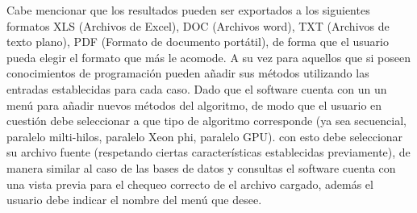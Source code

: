 Cabe mencionar que los resultados pueden ser exportados a los siguientes formatos XLS (Archivos de Excel), DOC (Archivos word), TXT (Archivos de texto plano), PDF (Formato de documento portátil), de forma que el usuario pueda elegir el formato que más le acomode. A su vez para aquellos que si poseen conocimientos de programación pueden añadir sus métodos utilizando las entradas establecidas para cada caso. Dado que el software cuenta con un un menú para añadir nuevos métodos del algoritmo, de modo que el usuario en cuestión debe seleccionar a que tipo de algoritmo corresponde (ya sea secuencial, paralelo milti-hilos, paralelo Xeon phi, paralelo GPU). con esto debe seleccionar su archivo fuente (respetando ciertas características establecidas previamente), de manera similar al caso de las bases de datos y consultas el software cuenta con una vista previa para el chequeo correcto de el archivo cargado, además el usuario debe indicar el nombre del menú que desee.\\\\  